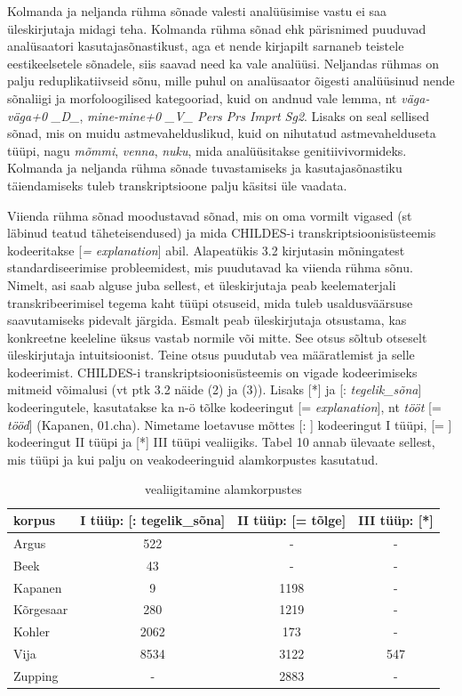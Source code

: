 \documentclass[12pt]{article}
\begin{document}
Kolmanda ja neljanda rühma sõnade valesti analüüsimise vastu ei saa üleskirjutaja midagi teha. Kolmanda rühma sõnad ehk pärisnimed puuduvad analüsaatori kasutajasõnastikust, aga et nende kirjapilt sarnaneb teistele eestikeelsetele sõnadele, siis saavad need ka vale analüüsi. Neljandas rühmas on palju reduplikatiivseid sõnu, mille puhul on analüsaator õigesti analüüsinud nende sõnaliigi ja morfoloogilised kategooriad, kuid on andnud vale lemma, nt \emph{väga-väga+0 \_D\_}, \emph{mine-mine+0 \_V\_ Pers Prs Imprt Sg2}. Lisaks on seal sellised sõnad, mis on muidu astmevahelduslikud, kuid on nihutatud astmevahelduseta tüüpi, nagu 
\emph{mõmmi}, \emph{venna}, \emph{nuku}, mida analüüsitakse genitiivivormideks. Kolmanda ja neljanda rühma sõnade tuvastamiseks ja kasutajasõnastiku täiendamiseks tuleb transkriptsioone palju käsitsi üle vaadata.

Viienda rühma sõnad moodustavad sõnad, mis on oma vormilt vigased (st läbinud teatud täheteisendused) ja mida CHILDES-i transkriptsioonisüsteemis kodeeritakse [\emph{= explanation}] abil. Alapeatükis 3.2 kirjutasin mõningatest standardiseerimise probleemidest, mis puudutavad ka viienda rühma sõnu. Nimelt, asi saab alguse juba sellest, et üleskirjutaja peab keelematerjali transkribeerimisel tegema kaht tüüpi otsuseid, mida tuleb usaldusväärsuse saavutamiseks pidevalt järgida. Esmalt peab üleskirjutaja otsustama, kas konkreetne keeleline üksus vastab normile või mitte. See otsus sõltub otseselt üleskirjutaja intuitsioonist. Teine otsus puudutab vea määratlemist ja selle kodeerimist. CHILDES-i transkriptsioonisüsteemis on vigade kodeerimiseks mitmeid võimalusi (vt ptk 3.2 näide (2) ja (3)). Lisaks [*] ja [: \emph{tegelik\_sõna}] kodeeringutele, kasutatakse ka n-ö tõlke kodeeringut [= \emph{explanation}], nt \emph{tööt} [= \emph{tööd}] (Kapanen, 01.cha). Nimetame loetavuse mõttes [: ] kodeeringut I tüüpi, [= ] kodeeringut II tüüpi ja [*] III tüüpi vealiigiks. Tabel 10 annab ülevaate sellest, mis tüüpi ja kui palju on veakodeeringuid alamkorpustes kasutatud.

\begin{table}[H]
\centering
\caption{vealiigitamine alamkorpustes}
\begin{tabular}{|l|c|c|c|}
\hline
korpus    & I tüüp: {[}: tegelik\_sõna{]} & II tüüp: {[}= tõlge{]} & III tüüp: {[}*{]} \\ \hline\hline
Argus     & 522                   & -             & -       \\ \hline
Beek      & 43                    & -             & -       \\ \hline
Kapanen   & 9                     & 1198          & -       \\ \hline
Kõrgesaar & 280                   & 1219          & -       \\ \hline
Kohler    & 2062                  & 173           & -       \\ \hline
Vija      & 8534                  & 3122          & 547     \\ \hline
Zupping   & -                     & 2883          & -       \\ \hline
\end{tabular}
\end{table}
\end{document}
